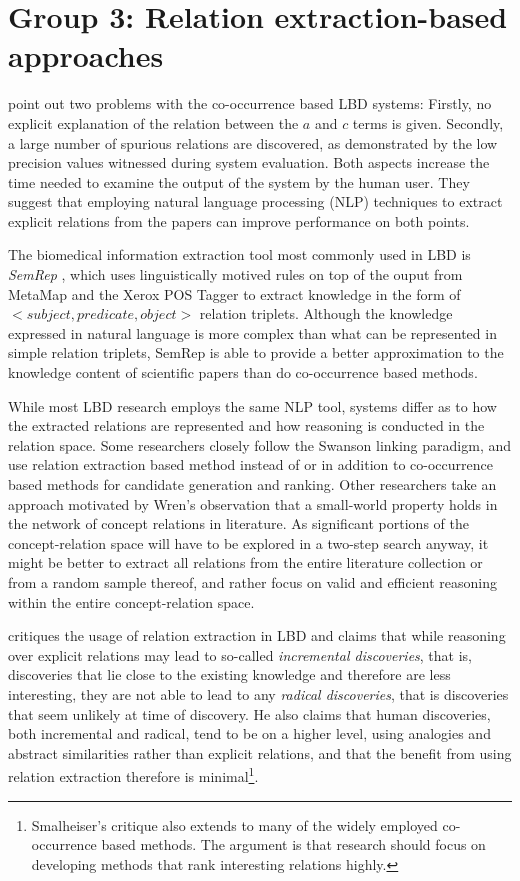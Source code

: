 \section{Group 3: Relation extraction-based approaches}
\label{sec:relex}	

\citet{hri06} point out two problems with the co-occurrence based LBD systems: Firstly, no explicit explanation of the relation between the $a$ and $c$ terms is given. Secondly, a large number of spurious relations are discovered, as demonstrated by the low precision values witnessed during system evaluation. Both aspects increase the time needed to examine the output of the system by the human user. They suggest that employing natural language processing (NLP) techniques to extract explicit relations from the papers can improve performance on both points.

The biomedical information extraction tool most commonly used in LBD is \emph{SemRep} \cite{rin03}, which uses linguistically motived rules on top of the ouput from MetaMap and the Xerox POS Tagger to extract knowledge in the form of $<subject, predicate, object>$ relation triplets. Although the knowledge expressed in natural language is more complex than what can be represented in simple relation triplets, SemRep is able to provide a better approximation to the knowledge content of scientific papers than do co-occurrence based methods.

While most LBD research employs the same NLP tool, systems differ as to how the extracted relations are represented and how reasoning is conducted in the relation space. Some researchers closely follow the Swanson linking paradigm, and use relation extraction based method instead of or in addition to co-occurrence based methods for candidate generation and ranking. Other researchers take an approach motivated by Wren's observation that a small-world property holds in the network of concept relations in literature.
As significant portions of the concept-relation space will have to be explored in a two-step search anyway, it might be better to extract all relations from the entire literature collection or from a random sample thereof, and rather focus on valid and efficient reasoning within the entire concept-relation space. 

\citet{sma12} critiques the usage of relation extraction in LBD and claims that while reasoning over explicit relations may lead to so-called \emph{incremental discoveries}, that is, discoveries that lie close to the existing knowledge and therefore are less interesting, they are not able to lead to any \emph{radical discoveries}, that is discoveries that seem unlikely at time of discovery. He also claims that human discoveries, both incremental and radical, tend to be on a higher level, using analogies and abstract similarities rather than explicit relations, and that the benefit from using relation extraction therefore is minimal\footnote{Smalheiser's critique also extends to many of the widely employed co-occurrence based methods. The argument is that research should focus on developing methods that rank interesting relations highly.}.

